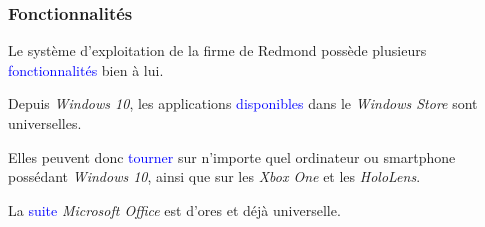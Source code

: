 \documentclass[aspectratio=169]{beamer}
\begin{document}
\begin{frame}
  \frametitle{Fonctionnalités}
  Le système d'exploitation de la firme de Redmond possède plusieurs
  \textcolor{blue}{fonctionnalités} bien à lui.

  \hspace{0.5cm}

  Depuis \textit{Windows 10}, les applications \textcolor{blue}{disponibles} dans le
  \textit{Windows Store} sont universelles.

  \hspace{0.5cm}

  Elles peuvent donc \textcolor{blue}{tourner} sur n'importe quel ordinateur ou
  smartphone possédant \textit{Windows 10}, ainsi que sur les \textit{Xbox One} et les
  \textit{HoloLens}.

  \hspace{0.5cm}

  La \textcolor{blue}{suite} \textit{Microsoft Office} est d'ores et déjà universelle.
\end{frame}
\end{document}

